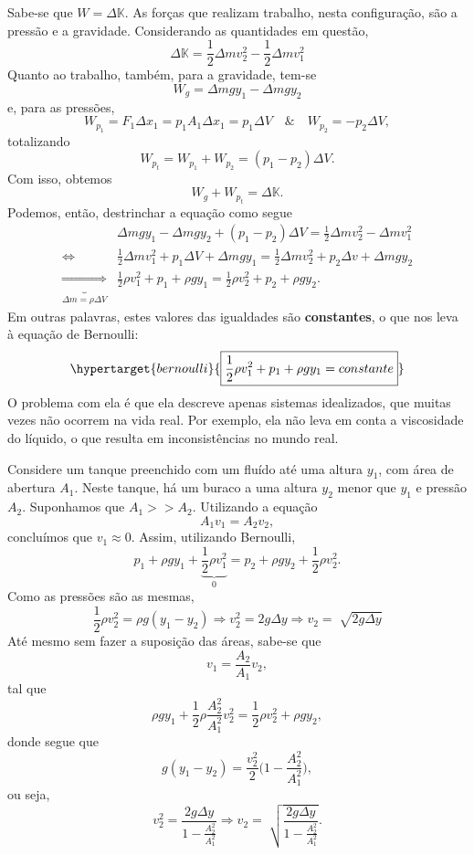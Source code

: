 \documentclass[physicsII_notes.tex]{subfiles}
\begin{document}
Sabe-se que \(W = \Delta \mathbb{K}\). As forças que realizam trabalho, nesta configuração, são a pressão e a gravidade. Considerando as quantidades em questão,
\[
	\Delta \mathbb{K} = \frac{1}{2}\Delta m v_{2}^{2} - \frac{1}{2}\Delta m v_{1}^{2}
\]
Quanto ao trabalho, também, para a gravidade, tem-se
\[
	W_{g} = \Delta mgy_{1} - \Delta mgy_{2}
\]
e, para as pressões,
\[
	W_{p_{1}} = F_{1}\Delta x_{1} = p_{1}A_{1}\Delta x_{1} = p_{1}\Delta V\quad\&\quad W_{p_{2}} = -p_{2}\Delta V,
\]
totalizando
\[
	W_{p_{t}} = W_{p_{1}} + W_{p_{2}} = (p_{1}-p_{2})\Delta V.
\]
Com isso, obtemos
\[
	W_{g}+W_{p_{t}} = \Delta \mathbb{K}.
\]
Podemos, então, destrinchar a equação como segue
\begin{align*}
	                                                      & \Delta mgy_{1}-\Delta mgy_{2} + (p_{1}-p_{2})\Delta V = \frac{1}{2}\Delta mv_{2}^{2}-\Delta mv_{1}^{2}                        \\
	\Longleftrightarrow\quad                              & \frac{1}{2}\Delta mv_{1}^{2} + p_{1}\Delta V + \Delta mgy_{1} = \frac{1}{2}\Delta mv_{2}^{2} + p_{2}\Delta v + \Delta mgy_{2} \\
	\underbrace{\Longrightarrow}_{\Delta m=\rho \Delta V} & \frac{1}{2}\rho v_{1}^{2} + p_{1} + \rho gy_{1} = \frac{1}{2}\rho v_{2}^{2} + p_{2} + \rho gy_{2}.
\end{align*}
Em outras palavras, estes valores das igualdades são \textbf{constantes}, o que nos leva à equação de Bernoulli:
\[
	\hypertarget{bernoulli}{\boxed{\frac{1}{2}\rho v_{1}^{2}+p_{1}+\rho gy_{1}=constante}}
\]
O problema com ela é que ela descreve apenas sistemas idealizados, que muitas vezes não ocorrem na vida real. Por exemplo,
ela não leva em conta a viscosidade do líquido, o que resulta em inconsistências no mundo real.
\begin{example}
	Considere um tanque preenchido com um fluído até uma altura \(y_{1}\), com área de abertura \(A_{1}\). Neste tanque, há um buraco
	a uma altura \(y_{2}\) menor que \(y_{1}\) e pressão \(A_{2}\). Suponhamos que \(A_{1}>> A_{2}\). Utilizando a equação
	\[
		A_{1}v_{1} = A_{2}v_{2},
	\]
	concluímos que \(v_{1}\approx0\). Assim, utilizando Bernoulli,
	\[
		p_{1} + \rho gy_{1} + \underbrace{\frac{1}{2}\rho v_{1}^{2}}_{0} = p_{2} + \rho gy_{2} + \frac{1}{2}\rho v_{2}^{2}.
	\]
	Como as pressões são as mesmas,
	\[
		\frac{1}{2}\rho v_{2}^{2} = \rho g(y_{1}-y_{2}) \Rightarrow v_{2}^{2} = 2g\Delta y \Rightarrow v_{2}=\sqrt[]{2g\Delta y}
	\]
	Até mesmo sem fazer a suposição das áreas, sabe-se que
	\[
		v_{1} = \frac{A_{2}}{A_{1}}v_{2},
	\]
	tal que
	\[
		\rho gy_{1} + \frac{1}{2}\rho \frac{A_{2}^{2}}{A_{1}^{2}}v_{2}^{2} = \frac{1}{2}\rho v_{2}^{2} + \rho gy_{2},
	\]
	donde segue que
	\[
		g(y_{1}-y_{2}) = \frac{v_{2}^{2}}{2}\biggl(1-\frac{A_{2}^{2}}{A_{1}^{2}}\biggr),
	\]
	ou seja,
	\[
		v_{2}^{2} = \frac{2g\Delta y}{1-\frac{A_{2}^{2}}{A_{1}^{2}}} \Rightarrow v_{2} = \sqrt[]{\frac{2g\Delta y}{1-\frac{A_{2}^{2}}{A_{1}^{2}}}}.
	\]
\end{example}
\end{document}
